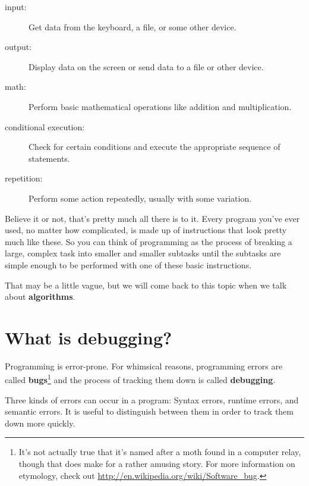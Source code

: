 \documentclass[10pt]{book}
\begin{document}
\begin{description}

\item[input:] Get data from the keyboard, a file, or some other device.

\item[output:] Display data on the screen or send data to a file or other device.

\item[math:] Perform basic mathematical operations like addition and multiplication.

\item[conditional execution:] Check for certain conditions and execute the appropriate sequence of statements.

\item[repetition:] Perform some action repeatedly, usually with some variation.

\end{description}

Believe it or not, that's pretty much all there is to it.  Every program you've ever used, no matter how complicated, is made up of instructions that look pretty much like these.  So you can think of programming as the process of breaking a large, complex task into smaller and smaller subtasks until the subtasks are simple enough to be performed with one of these basic instructions.


That may be a little vague, but we will come back to this topic when we talk about {\bf algorithms}.

\section{What is debugging?}

Programming is error-prone.  For whimsical reasons, programming errors are called {\bf bugs}\footnote{It's not actually true that it's named after a moth found in a computer relay, though that does make for a rather amusing story. For more information on etymology, check out \url{http://en.wikipedia.org/wiki/Software_bug}.} and the process of tracking them down is called {\bf debugging}.


Three kinds of errors can occur in a program: Syntax errors, runtime errors, and semantic errors. It is useful to distinguish between them in order to track them down more quickly.
\end{document}
